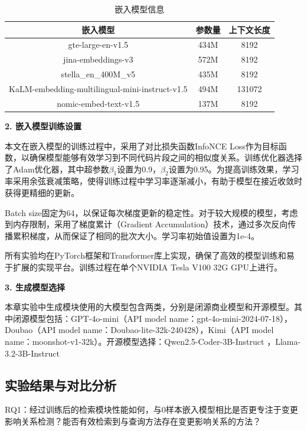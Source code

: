     \begin{table}[htbp]
    \caption{嵌入模型信息}
    \label{2_嵌入模型参数量}
    \vspace{0.5em}\centering\wuhao
    \begin{tabular}{ccc}
    \toprule
    嵌入模型 & 参数量 & 上下文长度  \\
    \midrule
    gte-large-en-v1.5 & 434M & 8192 \\
    jina-embeddings-v3 & 572M & 8192\\
    stella\_en\_400M\_v5 & 435M & 8192 \\
    KaLM-embedding-multilingual-mini-instruct-v1.5 & 494M & 131072 \\
    nomic-embed-text-v1.5 & 137M & 8192 \\
    \bottomrule
    \end{tabular}
    \end{table}

\noindent \textbf{2. 嵌入模型训练设置}

本文在嵌入模型的训练过程中，采用了对比损失函数InfoNCE Loss作为目标函数，以确保模型能够有效学习到不同代码片段之间的相似度关系。训练优化器选择了Adam优化器，其中超参数$\beta_1$设置为0.9，$\beta_2$设置为0.95。为提高训练效果，学习率采用余弦衰减策略，使得训练过程中学习率逐渐减小，有助于模型在接近收敛时获得更精细的更新。

Batch size固定为64，以保证每次梯度更新的稳定性。对于较大规模的模型，考虑到内存限制，采用了梯度累计（Gradient Accumulation）技术，通过多次反向传播累积梯度，从而保证了相同的批次大小。学习率初始值设置为1e-4。

所有实验均在PyTorch框架和Transformer库上实现，确保了高效的模型训练和易于扩展的实现平台。训练过程在单个NVIDIA Tesla V100 32G GPU上进行。

\noindent \textbf{3. 生成模型选择}
    
本章实验中生成模块使用的大模型包含两类，分别是闭源商业模型和开源模型。其中闭源模型包括：GPT-4o-mini（API model name：gpt-4o-mini-2024-07-18），Doubao（API model name：Doubao-lite-32k-240428），Kimi（API model name：moonshot-v1-32k）。开源模型选择：Qwen2.5-Coder-3B-Instruct ，Llama-3.2-3B-Instruct


\subsection{实验结果与对比分析}

RQ1：经过训练后的检索模块性能如何，与0样本嵌入模型相比是否更专注于变更影响关系检测？能否有效检索到与查询方法存在变更影响关系的方法？


